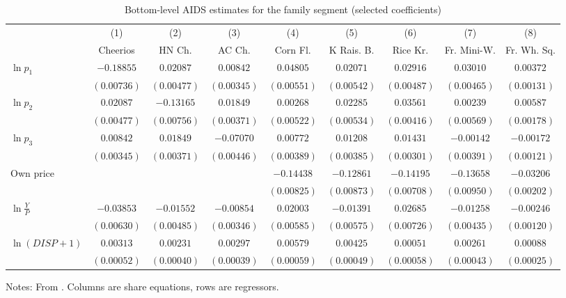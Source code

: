 \begin{table}[htbp]
\centering
\caption{Bottom-level AIDS estimates for the family segment (selected coefficients)}\label{tab:10-hausman-aids}
\begin{threeparttable}
\footnotesize
\setlength{\tabcolsep}{3.2pt}
\begin{tabular}{@{}lcccccccc@{}}
\toprule
 & (1) & (2) & (3) & (4) & (5) & (6) & (7) & (8) \\
 & Cheerios & HN Ch. & AC Ch. & Corn Fl. & K Rais. B. & Rice Kr. & Fr. Mini-W. & Fr. Wh. Sq. \\
\midrule
$\ln p_1$ & $-0.18855$ & $0.02087$ & $0.00842$ & $0.04805$ & $0.02071$ & $0.02916$ & $0.03010$ & $0.00372$ \\
 & $(0.00736)$ & $(0.00477)$ & $(0.00345)$ & $(0.00551)$ & $(0.00542)$ & $(0.00487)$ & $(0.00465)$ & $(0.00131)$ \\
$\ln p_2$ & $0.02087$ & $-0.13165$ & $0.01849$ & $0.00268$ & $0.02285$ & $0.03561$ & $0.00239$ & $0.00587$ \\
 & $(0.00477)$ & $(0.00756)$ & $(0.00371)$ & $(0.00522)$ & $(0.00534)$ & $(0.00416)$ & $(0.00569)$ & $(0.00178)$ \\
$\ln p_3$ & $0.00842$ & $0.01849$ & $-0.07070$ & $0.00772$ & $0.01208$ & $0.01431$ & $-0.00142$ & $-0.00172$ \\
 & $(0.00345)$ & $(0.00371)$ & $(0.00446)$ & $(0.00389)$ & $(0.00385)$ & $(0.00301)$ & $(0.00391)$ & $(0.00121)$ \\
Own price &  &  &  & $-0.14438$ & $-0.12861$ & $-0.14195$ & $-0.13658$ & $-0.03206$ \\
 &  &  &  & $(0.00825)$ & $(0.00873)$ & $(0.00708)$ & $(0.00950)$ & $(0.00202)$ \\
$\ln\frac{Y}{P}$ & $-0.03853$ & $-0.01552$ & $-0.00854$ & $0.02003$ & $-0.01391$ & $0.02685$ & $-0.01258$ & $-0.00246$ \\
 & $(0.00630)$ & $(0.00485)$ & $(0.00346)$ & $(0.00585)$ & $(0.00575)$ & $(0.00726)$ & $(0.00435)$ & $(0.00120)$ \\
$\ln(DISP + 1)$ & $0.00313$ & $0.00231$ & $0.00297$ & $0.00579$ & $0.00425$ & $0.00051$ & $0.00261$ & $0.00088$ \\
 & $(0.00052)$ & $(0.00040)$ & $(0.00039)$ & $(0.00059)$ & $(0.00049)$ & $(0.00058)$ & $(0.00043)$ & $(0.00025)$ \\
\bottomrule
\end{tabular}
\begin{tablenotes}[flushleft]\footnotesize
\item Notes: From \citet[Table 5.3]{Hausman1997}. Columns are share equations, rows are regressors.

\end{tablenotes}
\end{threeparttable}
\end{table}
